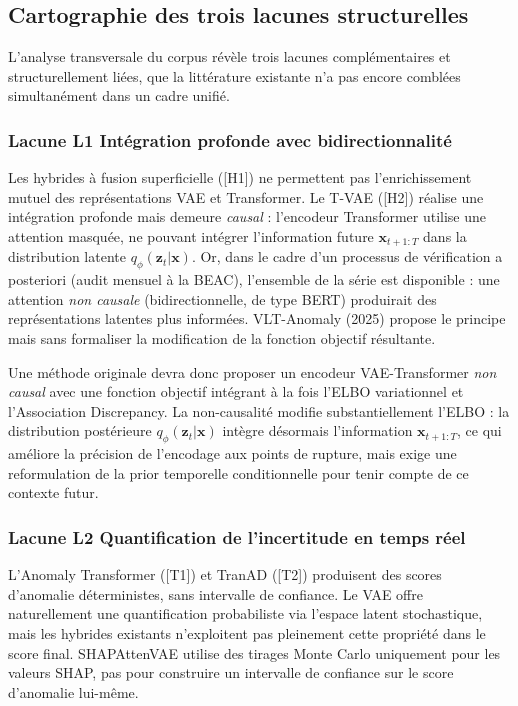 \documentclass[12pt,a4paper]{article}
\begin{document}
\subsection{Cartographie des trois lacunes structurelles}

L'analyse transversale du corpus révèle trois lacunes complémentaires et structurellement liées, que la littérature existante n'a pas encore comblées simultanément dans un cadre unifié.

\subsubsection{Lacune L1 Intégration profonde avec bidirectionnalité}

Les hybrides à fusion superficielle ([H1]) ne permettent pas l'enrichissement mutuel des représentations VAE et Transformer. Le T-VAE ([H2]) réalise une intégration profonde mais demeure \textit{causal} : l'encodeur Transformer utilise une attention masquée, ne pouvant intégrer l'information future $\mathbf{x}_{t+1:T}$ dans la distribution latente $q_\phi(\mathbf{z}_t|\mathbf{x})$. Or, dans le cadre d'un processus de vérification a posteriori (audit mensuel à la BEAC), l'ensemble de la série est disponible : une attention \textit{non causale} (bidirectionnelle, de type BERT) produirait des représentations latentes plus informées. VLT-Anomaly (2025) propose le principe mais sans formaliser la modification de la fonction objectif résultante.

Une méthode originale devra donc proposer un encodeur VAE-Transformer \textit{non causal} avec une fonction objectif intégrant à la fois l'ELBO variationnel et l'Association Discrepancy. La non-causalité modifie substantiellement l'ELBO : la distribution postérieure $q_\phi(\mathbf{z}_t|\mathbf{x})$ intègre désormais l'information $\mathbf{x}_{t+1:T}$, ce qui améliore la précision de l'encodage aux points de rupture, mais exige une reformulation de la prior temporelle conditionnelle pour tenir compte de ce contexte futur.

\subsubsection{Lacune L2 Quantification de l'incertitude en temps réel}

L'Anomaly Transformer ([T1]) et TranAD ([T2]) produisent des scores d'anomalie déterministes, sans intervalle de confiance. Le VAE offre naturellement une quantification probabiliste via l'espace latent stochastique, mais les hybrides existants n'exploitent pas pleinement cette propriété dans le score final. SHAPAttenVAE utilise des tirages Monte Carlo uniquement pour les valeurs SHAP, pas pour construire un intervalle de confiance sur le score d'anomalie lui-même.
\end{document}
